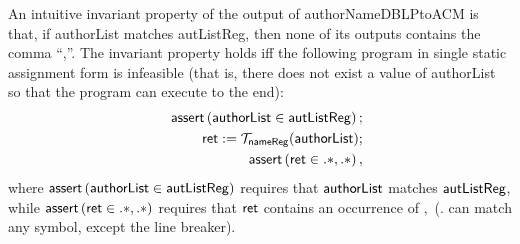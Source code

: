 
An intuitive invariant property of the output of {\sf authorNameDBLPtoACM} is that, if {\sf authorList} matches {\sf autListReg}, then none of its outputs contains the comma ``,''. The invariant property holds iff the following program in single static assignment form is infeasible (that is, there does not exist a value of {\sf authorList} so that the program can execute to the end):
%
\begin{eqnarray}\label{eqn:exmp}
& & \textsf{assert}\left(\sf authorList \in autListReg\right);\nonumber \\
& & \sf ret  := \sf  \mathcal{T}_{nameReg}(authorList);\nonumber \\
& &  \textsf{assert}\left(\sf ret \in .*,.*\right),
\end{eqnarray}
%
where $\textsf{assert}\left(\sf authorList \in autListReg\right)$ requires that $\sf authorList$ matches $\sf autListReg$, while $\textsf{assert}\left(\sf ret \in .*,.*\right)$ requires that $\sf ret$ contains an occurrence of $,$ ($.$ can match any symbol, except the line breaker).

